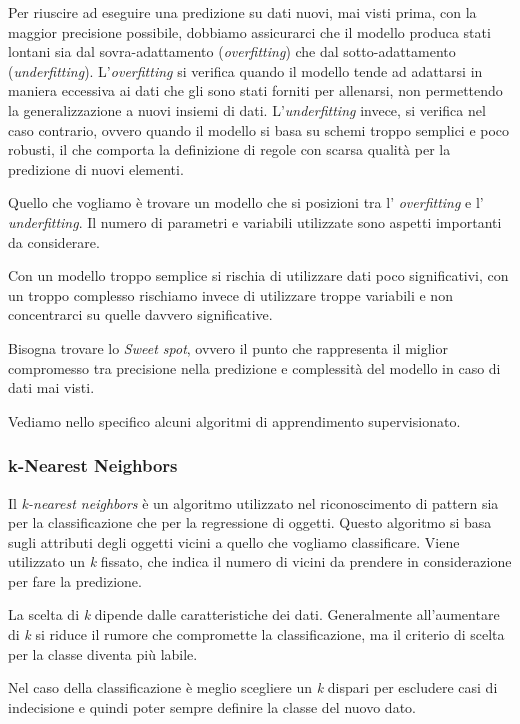 \documentclass[a4paper,12pt]{report}
\begin{document}
Per riuscire ad eseguire una predizione su dati nuovi, mai visti prima, con la maggior precisione possibile, dobbiamo assicurarci che il modello produca stati lontani sia dal sovra-adattamento (\textit{overfitting}) che dal sotto-adattamento (\textit{underfitting}).
L’\textit{overfitting} si verifica quando il modello tende ad adattarsi in maniera eccessiva ai dati che gli sono stati forniti per allenarsi, non permettendo la generalizzazione a nuovi insiemi di dati. L’\textit{underfitting} invece, si verifica nel caso contrario, ovvero quando il modello si basa su schemi troppo semplici e poco robusti, il che comporta la definizione di regole con scarsa qualità per la predizione di nuovi elementi.

Quello che vogliamo è trovare un modello che si posizioni tra l' \textit{overfitting} e l' \textit{underfitting}.
Il numero di parametri e variabili utilizzate sono aspetti importanti da considerare.

Con un modello troppo semplice si rischia di utilizzare dati poco significativi, con un troppo complesso rischiamo invece di utilizzare troppe variabili e non concentrarci su quelle davvero significative.

Bisogna trovare lo \textit{Sweet spot}, ovvero il punto che rappresenta il miglior compromesso tra precisione nella predizione e complessità del modello in caso di dati mai visti.

\bigskip

Vediamo nello specifico alcuni algoritmi di apprendimento supervisionato.

\subsubsection{k-Nearest Neighbors}

Il \textit{k-nearest neighbors} è un algoritmo utilizzato nel riconoscimento di pattern sia per la classificazione che per la regressione di oggetti. 
Questo algoritmo si basa sugli attributi degli oggetti vicini a quello che vogliamo classificare.
Viene utilizzato un \textit{k} fissato, che indica il numero di vicini da prendere in considerazione per fare la predizione.

La scelta di \textit{k} dipende dalle caratteristiche dei dati. Generalmente all'aumentare di \textit{k} si riduce il rumore che compromette la classificazione, ma il criterio di scelta per la classe diventa più labile.

Nel caso della classificazione è meglio scegliere un \textit{k} dispari per escludere casi di indecisione e quindi poter sempre definire la classe del nuovo dato.
\end{document}
